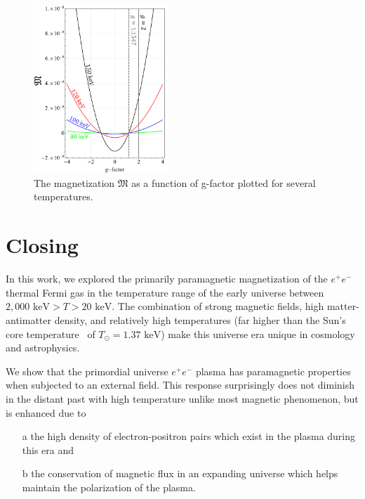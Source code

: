 \documentclass[reprint]{revtex4-2}
\newcommand*{\keV}{\text{ keV}}
\begin{document}
\begin{figure}[ht]
    \centering
    \includegraphics[width=0.45\textwidth]{plots/GFactor_02.png}
    \caption{The magnetization $\mathfrak M$ as a function of g-factor plotted for several temperatures.}
    \label{fig:gfac} 
\end{figure}

\section{Closing}
\label{sec:conclusions}
\noindent In this work, we explored the primarily paramagnetic magnetization of the $e^{+}e^{-}$ thermal Fermi gas in the temperature range of the early universe between $2,000\keV>T>20\keV$. The combination of strong magnetic fields, high matter-antimatter density, and relatively high temperatures (far higher than the Sun's core temperature~\cite{bahcall2001solar} of $T_{\odot}=1.37\keV$) make this universe era unique in cosmology and astrophysics.

We show that the primordial universe $e^{+}e^{-}$ plasma has paramagnetic properties when subjected to an external field. This response surprisingly does not diminish in the distant past with high temperature unlike most magnetic phenomenon, but is enhanced due to
\begin{itemize}
    \item[a] the high density of electron-positron pairs which exist in the plasma during this era and
    \item[b] the conservation of magnetic flux in an expanding universe which helps maintain the polarization of the plasma.
\end{itemize}
\end{document}
